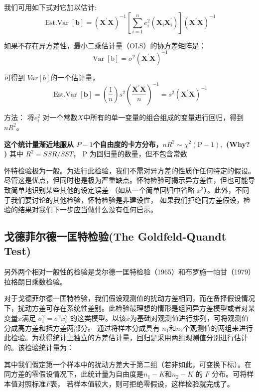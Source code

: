     我们可用如下式对它加以估计:
    $$ \operatorname{Est.Var}[\boldsymbol{b}]=\left( \boldsymbol{X^{\prime} X}\right)^{-1}
        \left[\sum_{i=1}^{n} e_{i}^{2}\left(\boldsymbol{X_{i} X_{i}^{\prime}}\right)\right]\left( \boldsymbol{X^{\prime} X}\right)^{-1} $$

    如果不存在异方差性，最小二乘估计量（OLS）的协方差矩阵是：
    $$ \operatorname{Var}[\boldsymbol{\mathrm{b}}]=\sigma^{2}\left( \boldsymbol{X^{\prime} X}\right)^{-1} $$

    可得到 $ Var[b] $的一个估计量，
    $$ \operatorname{Est.Var }[\boldsymbol{b}]=\left(\frac{1}{n}\right) s^{2}
        \left(\frac{\boldsymbol{X^{\prime} X}}{n}\right)^{-1}=s^{2}\left(\boldsymbol{X^{\prime} X}\right)^{-1} $$

    方法： 将$e_i^{2}$ 对一个常数$ X $中所有的单一变量的组合组成的变量进行回归，得到 $ nR^{2} $。

    {\bf 这个统计量渐近地服从 $ P-1 $个自由度的卡方分布，$n R^{2} \sim \chi^{2}(\mathrm{P}-1),$  (Why? )  }其中 $ R^{2}=SSR/SST $， P 为回归量的数量，但不包含常数

    怀特检验极为一般。为进行此检验，我们不需对异方差的性质作任何特定的假设。尽管这是优点，但同时也是极为严重缺点。怀特检验可揭示异方差性，但也可能导致简单地识别某些其他的设定误差
    （如从一个简单回归中省略 $ x^{2} $）。此外，不同于我们要讨论的其他检验，怀特检验是非建设性， 如果我们拒绝同方差假设，检验的结果对我们下一步应当做什么没有任何启示。

    \subsection{戈德菲尔德一匡特检验(The Goldfeld-Quandt Test)}

    另外两个相对一般性的检验是戈尔德一匡特检验（1965）和布罗施一帕甘（1979）拉格朗日乘数检验。

    对于戈德菲尔德一匡特检验，我们假设观测值的扰动方差相同，而在备择假设情况下，扰动方差可存在系统性差别。此检验最理想的情形是组间异方差模型或者对某变量$ x $满足
    $ \sigma_{i}^{2}=\sigma^{2} x_{i}^{2} $ 的这类模型。以该$ x $为基础对观测值进行排列，可将观测值分成高方差和抵方差两部分。
    通过将样本分成具有 $ n_1 $和$ n_2 $个观测值的两组来进行此检验。为获得统计上独立的方差估计量，回归是采用两组观测值分别进行估计的。该检验统计量为：

        其中我们假定第一个样本中的扰动方差大于第二组（若非如此，可变换下标）。在同方差的零假设情况下，此统计量为自由度是$ n_1 − K $和$ n_2 − K $ 的 $ F $ 分布。可将样本值对照标准$ F $表，
        若样本值较大，则可拒绝零假设，这样检验就完成了。

